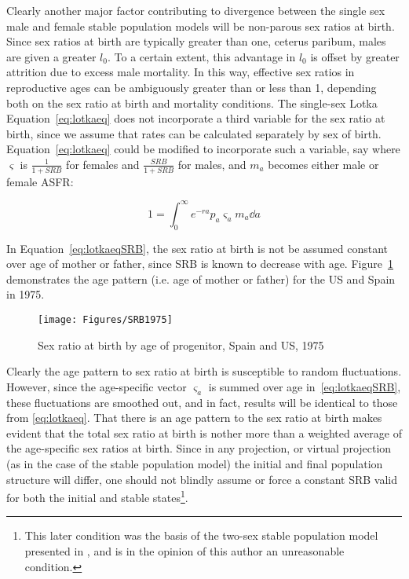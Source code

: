  \FloatBarrier
Clearly another major factor contributing to divergence between the single sex
male and female stable population models will be non-parous sex ratios at birth.
Since sex ratios at birth are typically greater than one, ceterus paribum, males
are given a greater $l_0$. To a certain extent, this advantage in $l_0$ is
offset by greater attrition due to excess male mortality. In this way, effective
sex ratios in reproductive ages can be ambiguously greater than or less than 1,
depending both on the sex ratio at birth and mortality conditions. The
single-sex Lotka Equation~\eqref{eq:lotkaeq} does not incorporate a third
variable for the sex ratio at birth, since we assume that rates can be
calculated separately by sex of birth. Equation~\eqref{eq:lotkaeq} could be
modified to incorporate such a variable, say where $\varsigma$ is
$\tfrac{1}{1+SRB}$ for females and $\tfrac{SRB}{1+SRB}$ for males, and $m_a$
becomes either male or female ASFR:

\begin{equation}
\label{eq:lotkaeqSRB}
1 = \int _0 ^\infty e^{-ra}p_a \varsigma_a m_a \dd a 
\end{equation}

In Equation~\eqref{eq:lotkaeqSRB}, the sex ratio at birth is not be assumed
constant over age of mother or father, since SRB is known to decrease with age.
Figure~\ref{fig:SRB1975} demonstrates the age pattern (i.e. age of mother or
father) for the US and Spain in 1975.

\begin{figure}[ht!]
        \centering  
          \caption{Sex ratio at birth by age of progenitor, Spain
          and US, 1975}
           \texttt{[image: Figures/SRB1975]}
          \label{fig:SRB1975}
\end{figure}

Clearly the age pattern to sex ratio at birth is susceptible to random
fluctuations. However, since the age-specific vector $\varsigma _a$ is summed
over age in~\eqref{eq:lotkaeqSRB}, these fluctuations are smoothed out, and in
fact, results will be identical to those from \eqref{eq:lotkaeq}. That there is
an age pattern to the sex ratio at birth makes evident that the total sex ratio 
at birth is nother more than a weighted
average of the age-specific sex ratios at birth. Since in any projection, or
virtual projection (as in the case of the stable population model) the initial
and final population structure will differ, one should not blindly assume or
force a constant SRB valid for both the initial and stable states\footnote{This
later condition was the basis of the two-sex stable population model presented in
\citet{mitra1982alternative,mitra1978derivation,mitra1976effect}, and is in the
opinion of this author an unreasonable condition.}.

